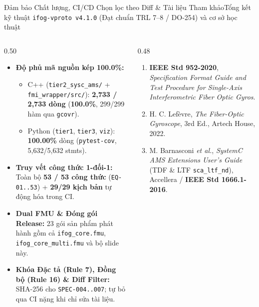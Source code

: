 \documentclass[aspectratio=169,8pt]{beamer}
\newcommand{\DocVersion}{v4.1.0}
\begin{document}
\begin{frame}{Đảm bảo Chất lượng, CI/CD Chọn lọc theo Diff \& Tài liệu Tham khảo}{Tổng kết kỹ thuật \texttt{ifog-vproto \DocVersion} (Đạt chuẩn TRL 7--8 / DO-254) và cơ sở học thuật}
\begin{columns}[T]
  \begin{column}{0.50\textwidth}
    \begin{eqbox}
      \begin{itemize}\setlength\itemsep{2.4pt}
        \item \textbf{Độ phủ mã nguồn kép 100.0\%:}
          \begin{itemize}\setlength\itemsep{1pt}
            \item C++ (\texttt{tier2\_sysc\_ams/} + \texttt{fmi\_wrapper/src/}): \textbf{2,733 / 2,733 dòng} (\textbf{100.0\%}, 299/299 hàm qua \texttt{gcovr}).
            \item Python (\texttt{tier1}, \texttt{tier3}, \texttt{viz}): \textbf{100.00\%} dòng (\texttt{pytest-cov}, 5,632/5,632 stmts).
          \end{itemize}
        \item \textbf{Truy vết công thức 1-đối-1:} Toàn bộ \textbf{53 / 53 công thức} (\texttt{EQ-01..53}) + \textbf{29/29 kịch bản} tự động hóa trong CI.
        \item \textbf{Dual FMU \& Đóng gói Release:} 23 gói sản phẩm phát hành gồm cả \texttt{ifog\_core.fmu}, \texttt{ifog\_core\_multi.fmu} và bộ slide này.
        \item \textbf{Khóa Đặc tả (Rule 7), Đồng bộ (Rule 16) \& Diff Filter:} SHA-256 cho \texttt{SPEC-004..007}; tự bỏ qua CI nặng khi chỉ sửa tài liệu.
      \end{itemize}
    \end{eqbox}
  \end{column}
  \begin{column}{0.48\textwidth}
    \begin{remarkbox}
      \scriptsize
      \begin{enumerate}\setlength\itemsep{1.4pt}
        \item \textbf{IEEE Std 952-2020}, \emph{Specification Format Guide and Test Procedure for Single-Axis Interferometric Fiber Optic Gyros}.
        \item H. C. Lefèvre, \emph{The Fiber-Optic Gyroscope}, 3rd Ed., Artech House, 2022.
        \item M. Barnasconi \emph{et al.}, \emph{SystemC AMS Extensions User's Guide} (TDF \& LTF \texttt{sca\_ltf\_nd}), Accellera / \textbf{IEEE Std 1666.1-2016}.

\end{enumerate}
\end{remarkbox}
\end{column}
\end{columns}
\end{frame}
\end{document}
